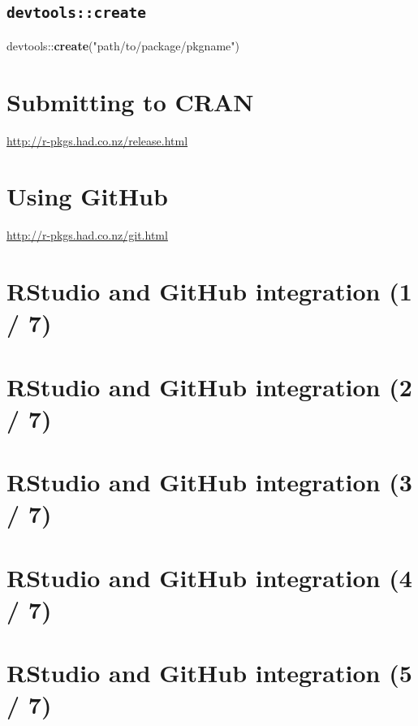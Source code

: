 \documentclass[]{book}
\newenvironment{Shaded}{\begin{snugshade}}{\end{snugshade}}
\newcommand{\KeywordTok}[1]{\textcolor[rgb]{0.13,0.29,0.53}{\textbf{{#1}}}}
\newcommand{\StringTok}[1]{\textcolor[rgb]{0.31,0.60,0.02}{{#1}}}
\newcommand{\NormalTok}[1]{{#1}}
\theoremstyle{definition}
\theoremstyle{definition}
\theoremstyle{definition}
\theoremstyle{remark}
\begin{document}
\subsection{\texorpdfstring{\texttt{devtools::create}}{devtools::create}}\label{devtoolscreate}

\begin{Shaded}
\begin{Highlighting}[]
\NormalTok{devtools::}\KeywordTok{create}\NormalTok{(}\StringTok{"path/to/package/pkgname"}\NormalTok{)}
\end{Highlighting}
\end{Shaded}

\section{Submitting to CRAN}\label{submitting-to-cran}

\url{http://r-pkgs.had.co.nz/release.html}

\section{Using GitHub}\label{using-github}

\url{http://r-pkgs.had.co.nz/git.html}

\section{RStudio and GitHub integration (1 /
7)}\label{rstudio-and-github-integration-1-7}

\section{RStudio and GitHub integration (2 /
7)}\label{rstudio-and-github-integration-2-7}

\section{RStudio and GitHub integration (3 /
7)}\label{rstudio-and-github-integration-3-7}

\section{RStudio and GitHub integration (4 /
7)}\label{rstudio-and-github-integration-4-7}

\section{RStudio and GitHub integration (5 /
7)}\label{rstudio-and-github-integration-5-7}
\end{document}
